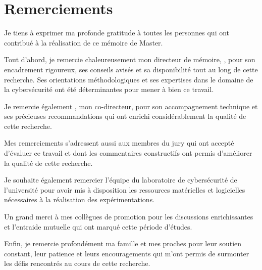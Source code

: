
\chapter*{Remerciements}

Je tiens à exprimer ma profonde gratitude à toutes les personnes qui ont contribué à la réalisation de ce mémoire de Master.

Tout d'abord, je remercie chaleureusement mon directeur de mémoire, \directeur, pour son encadrement rigoureux, ses conseils avisés et sa disponibilité tout au long de cette recherche. Ses orientations méthodologiques et ses expertises dans le domaine de la cybersécurité ont été déterminantes pour mener à bien ce travail.

Je remercie également \codirecteur, mon co-directeur, pour son accompagnement technique et ses précieuses recommandations qui ont enrichi considérablement la qualité de cette recherche.

Mes remerciements s'adressent aussi aux membres du jury qui ont accepté d'évaluer ce travail et dont les commentaires constructifs ont permis d'améliorer la qualité de cette recherche.

Je souhaite également remercier l'équipe du laboratoire de cybersécurité de l'université pour avoir mis à disposition les ressources matérielles et logicielles nécessaires à la réalisation des expérimentations.

Un grand merci à mes collègues de promotion pour les discussions enrichissantes et l'entraide mutuelle qui ont marqué cette période d'études.

Enfin, je remercie profondément ma famille et mes proches pour leur soutien constant, leur patience et leurs encouragements qui m'ont permis de surmonter les défis rencontrés au cours de cette recherche.

\vfill

\cleardoublepage